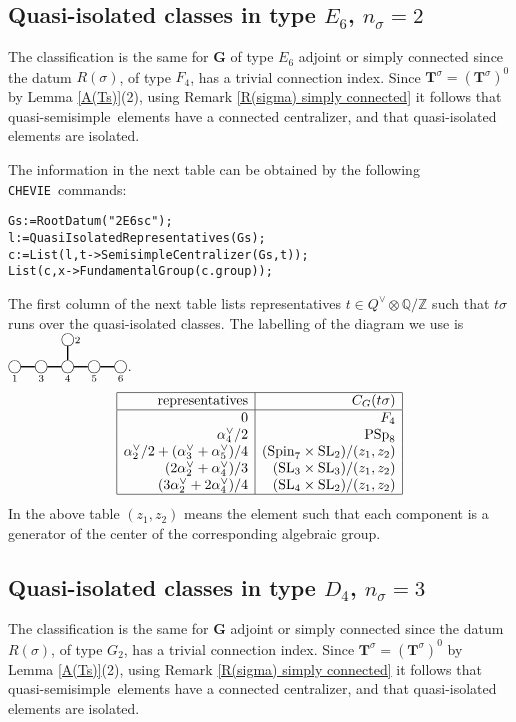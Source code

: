 \documentclass{amsart}
\numberwithin{equation}{section}
\theoremstyle{definition}
\theoremstyle{remark}
\newcommand\bG{{\mathbf G}}
\newcommand\bT{{\mathbf T}}
\newcommand\BQ{{\mathbb Q}}
\newcommand\BZ{{\mathbb Z}}
\newcommand\Tso{{(\bT^\sigma)^0}}
\newcommand\Ts{{\bT^\sigma}}
\newcommand\SL{\mathrm{SL}}
\newcommand\PSp{\mathrm{PSp}}
\newcommand\Spin{\mathrm{Spin}}
\newcommand\qss{quasi-semisimple}
\newcommand\CHEVIE{{\tt CHEVIE}}
\newcommand{\nnode}[1]{{\kern 4.5pt\hbox to
0pt{\hss{$\mathop\bigcirc\limits_{#1}$}\hss}\kern 4.4pt}}
\newcommand\edge{{\vrule width10pt height3pt depth-2pt}}
\newcommand\vertbar[2]{\rlap{\kern4pt\vrule width1pt height17.3pt depth-7.3pt}
 \rlap{\raise19.4pt\hbox{$\kern -0.4pt\bigcirc\scriptstyle#2$}}
                 \nnode{#1}}
\begin{document}
\subsection*{Quasi-isolated classes in type $E_6$, $n_\sigma=2$}
The  classification is the same for $\bG$ of type $E_6$
adjoint or simply connected since
the  datum $R(\sigma)$, of type $F_4$,  has a trivial connection index.
Since $\Ts=\Tso$ by Lemma \ref{A(Ts)}(2), using Remark \ref{R(sigma) simply connected} it
follows that \qss\ elements have a connected centralizer, and that
quasi-isolated elements are isolated.

The information in the next table can be obtained by the following \CHEVIE\
commands:
\begin{verbatim}
Gs:=RootDatum("2E6sc");
l:=QuasiIsolatedRepresentatives(Gs);
c:=List(l,t->SemisimpleCentralizer(Gs,t));
List(c,x->FundamentalGroup(c.group));
\end{verbatim}

The first column of the next table lists representatives
$t\in Q^\vee\otimes\BQ/\BZ$ such that $t\sigma$ runs over the quasi-isolated
classes.
The labelling of the diagram we use is
$\nnode1\edge\nnode3\edge\vertbar42\edge\nnode5\edge\nnode6$.
$$\begin{array}{|r|r|}
\noalign{\hrule}
\text{representatives}&C_G(t\sigma)\\
\noalign{\hrule}
0&F_4\\
\alpha^\vee_4/2&\PSp_8\\
\alpha^\vee_2/2+(\alpha^\vee_3+\alpha^\vee_5)/4&(\Spin_7\times\SL_2)/(z_1,z_2)\\
(2\alpha^\vee_2+\alpha^\vee_4)/3&(\SL_3\times \SL_3)/(z_1,z_2)\\
(3\alpha^\vee_2+2\alpha^\vee_4)/4&(\SL_4\times\SL_2)/(z_1,z_2)\\
\noalign{\hrule}
\end{array}
$$
In the above table $(z_1,z_2)$ means the element such that each component is a
generator of the center of the corresponding algebraic group.

\subsection*{Quasi-isolated classes in type $D_4$, $n_\sigma=3$}
\label{3D4}

The  classification is the same for $\bG$ adjoint or simply connected since
the  datum $R(\sigma)$, of type $G_2$,  has a trivial connection index. 
Since $\Ts=\Tso$ by Lemma \ref{A(Ts)}(2), using Remark \ref{R(sigma) simply connected} it
follows that \qss\ elements have a connected centralizer, and that
quasi-isolated elements are isolated.
\end{document}
